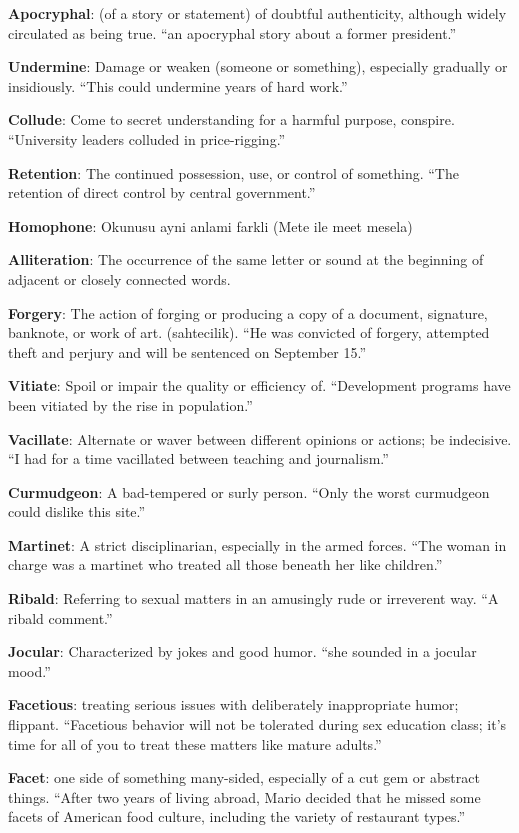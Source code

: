\documentclass[12pt, a4paper]{ximera}
\begin{document}
\textbf{Apocryphal}: (of a story or statement) of doubtful authenticity, although widely circulated as being true. ``an apocryphal story about a former president.''

\textbf{Undermine}: Damage or weaken (someone or something), especially gradually or insidiously. ``This could undermine years of hard work.''

\textbf{Collude}: Come to secret understanding for a harmful purpose, conspire. ``University leaders colluded in price-rigging.''

\textbf{Retention}: The continued possession, use, or control of something. ``The retention of direct control by central government.''

\textbf{Homophone}: Okunusu ayni anlami farkli (Mete ile meet mesela)

\textbf{Alliteration}: The occurrence of the same letter or sound at the beginning of adjacent or closely connected words.

\textbf{Forgery}: The action of forging or producing a copy of a document, signature, banknote, or work of art. (sahtecilik). ``He was convicted of forgery, attempted theft and perjury and will be sentenced on September 15.''

\textbf{Vitiate}: Spoil or impair the quality or efficiency of. ``Development programs have been vitiated by the rise in population.''

\textbf{Vacillate}: Alternate or waver between different opinions or actions; be indecisive. ``I had for a time vacillated between teaching and journalism.''

\textbf{Curmudgeon}: A bad-tempered or surly person. ``Only the worst curmudgeon could dislike this site.''

\textbf{Martinet}: A strict disciplinarian, especially in the armed forces. ``The woman in charge was a martinet who treated all those beneath her like children.''

\textbf{Ribald}: Referring to sexual matters in an amusingly rude or irreverent way. ``A ribald comment.''

\textbf{Jocular}: Characterized by jokes and good humor. ``she sounded in a jocular mood.''

\textbf{Facetious}: treating serious issues with deliberately inappropriate humor; flippant. ``Facetious behavior will not be tolerated during sex education class; it's time for all of you to treat these matters like mature adults.''

\textbf{Facet}: one side of something many-sided, especially of a cut gem or abstract things. ``After two years of living abroad, Mario decided that he missed some facets of American food culture, including the variety of restaurant types.''
\end{document}

